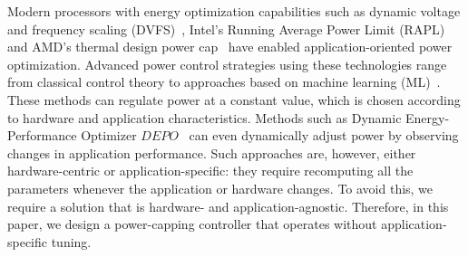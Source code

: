 
Modern processors with energy optimization capabilities such as dynamic voltage and frequency scaling (DVFS)~\cite{4658633}, Intel's Running Average Power Limit (RAPL)~\cite{david2010rapl} and AMD's thermal design power cap~\cite{10.1145/3321551} have enabled application-oriented power optimization. 
Advanced power control strategies using these technologies range from classical control theory to approaches based on machine learning (ML)~\cite{czarnul2019energy}. These methods can regulate power at a constant value, which is chosen according to hardware and application characteristics. Methods such as Dynamic Energy-Performance Optimizer $DEPO$~\cite{KRZYWANIAK2023396} can even dynamically adjust power by observing changes in application performance. %
Such approaches are, however, either hardware-centric or application-specific: they require recomputing all the parameters whenever the application or hardware changes. To avoid this, we require a solution that is hardware- and application-agnostic.  Therefore, in this paper, we design a power-capping controller that operates without application-specific tuning.



